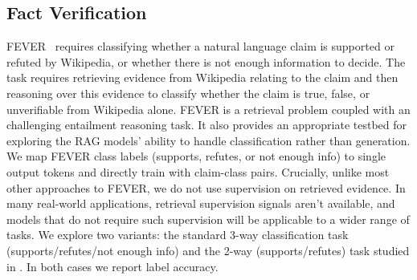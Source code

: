 \subsection{Fact Verification}

FEVER~\cite{thorne-etal-2018-fever} requires classifying whether a natural language claim is supported or refuted by Wikipedia, or whether there is not enough information to decide. The task requires retrieving evidence from Wikipedia relating to the claim and then reasoning over this evidence to classify whether the claim is true, false, or unverifiable from Wikipedia alone.
FEVER is a retrieval problem coupled with an challenging entailment reasoning task. It also  
provides an appropriate testbed for exploring the RAG models' ability to handle classification rather than generation. 
We map FEVER class labels (supports, refutes, or not enough info) to single output tokens and directly train with claim-class pairs. Crucially, unlike most other approaches to FEVER, we do not use supervision on retrieved evidence. In many real-world applications, retrieval supervision signals aren't available, and models that do not require such supervision will be applicable to a wider range of tasks. 
We explore two variants: the standard 3-way classification task (supports/refutes/not enough info) and the 2-way (supports/refutes) task studied in \citet{Thorne2020AvoidingCF}. In both cases we report label accuracy.

